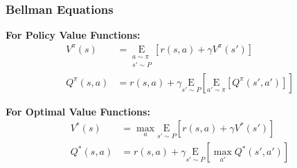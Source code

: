 \begin{frame}
    \frametitle{Bellman Equations}
    
    \textbf{For Policy Value Functions:}
    \begin{align*}
        V^{\pi}(s) &= \underset{\substack{a \sim \pi \\ s'\sim P}}{\mathrm{E}} 
        \left[ r(s,a) + \gamma V^{\pi}(s') \right] \\
        Q^{\pi}(s,a) &= r(s,a) + \gamma \underset{s'\sim P}{\mathrm{E}} 
        \left[ \underset{a'\sim \pi}{\mathrm{E}} \left[ Q^{\pi}(s',a') \right] \right]
    \end{align*}
    
    \vspace{0.3cm}
    \textbf{For Optimal Value Functions:}
    \begin{align*}
        V^{*}(s) &= \max_a \underset{s'\sim P}{\mathrm{E}} \left[ r(s,a) + \gamma V^{*}(s') \right] \\
        Q^{*}(s,a) &= r(s,a) + \gamma \underset{s'\sim P}{\mathrm{E}} \left[ \max_{a'} Q^{*}(s',a') \right]
    \end{align*}
\end{frame}